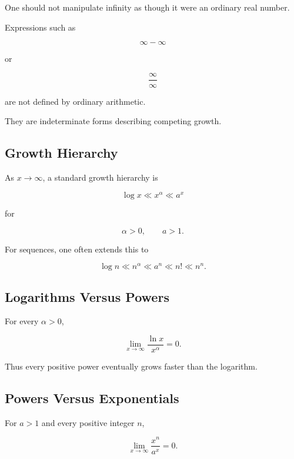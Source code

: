 One should not manipulate infinity as though it were an ordinary real number.

Expressions such as

\[
\infty-\infty
\]

or

\[
\frac{\infty}{\infty}
\]

are not defined by ordinary arithmetic.

They are indeterminate forms describing competing growth.

\subsection{Growth Hierarchy}
\label{subsec:growth-hierarchy-reference}

As \(x\to\infty\), a standard growth hierarchy is

\[
\boxed{
\log x
\ll
x^\alpha
\ll
a^x
}
\]

for

\[
\alpha>0,
\qquad
a>1.
\]

For sequences, one often extends this to

\[
\boxed{
\log n
\ll
n^\alpha
\ll
a^n
\ll
n!
\ll
n^n.
}
\]

\subsection{Logarithms Versus Powers}
\label{subsec:logarithm-versus-power}

For every \(\alpha>0\),

\[
\boxed{
\lim_{x\to\infty}
\frac{\ln x}{x^\alpha}
=
0.
}
\]

Thus every positive power eventually grows faster than the logarithm.

\subsection{Powers Versus Exponentials}
\label{subsec:power-versus-exponential}

For \(a>1\) and every positive integer \(n\),

\[
\boxed{
\lim_{x\to\infty}
\frac{x^n}{a^x}
=
0.
}
\]

